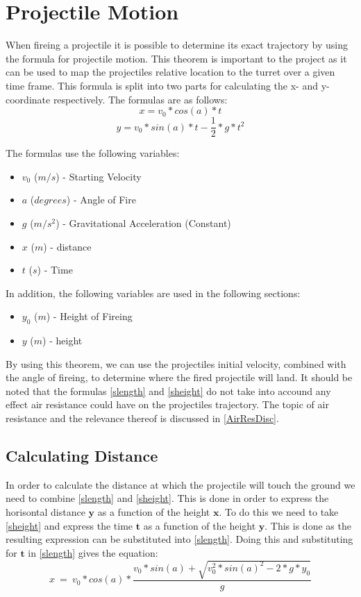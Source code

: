 \section{Projectile Motion}\label{ProjMotion}
When fireing a projectile it is possible to determine its exact trajectory by
using the formula for projectile motion. This theorem is important to the
project as it can be used to map the projectiles relative location to the turret
over a given time frame. This formula is split into two parts for calculating
the x- and y-coordinate respectively. The formulas are as follows:
\begin{equation}\label{slength}
x=v_0*cos(a)*t
\end{equation}
\begin{equation}\label{sheight}
y=v_0*sin(a)*t-\frac{1}{2}*g*t^2
\end{equation}

The formulas use the following variables:
\begin{itemize}
  \item $v_0$ ($m/s$) - Starting Velocity 
  \item $a$ ($degrees$) - Angle of Fire 
  \item $g$ ($m/s^2$) - Gravitational Acceleration (Constant)
  \item $x$ ($m$) - distance
  \item $t$ ($s$) - Time
\end{itemize}
In addition, the following variables are used in the following sections:
\begin{itemize}
  \item $y_0$ ($m$) - Height of Fireing 
  \item $y$ ($m$) - height
\end{itemize}

By using this theorem, we can use the projectiles initial velocity, combined
with the angle of fireing, to determine where the fired projectile will
land.\nl
It should be noted that the formulas \autoref{slength} and \autoref{sheight} do
not take into accound any effect air resistance could have on the projectiles
trajectory. The topic of air resistance and the relevance thereof is discussed
in \autoref{AirResDisc}.

\subsection{Calculating Distance}\label{CalcDist}
In order to calculate the distance at which the projectile will touch the ground
we need to combine \autoref{slength} and \autoref{sheight}. This is done in
order to express the horisontal distance $\mathbf{y}$ as a function of the
height $\mathbf{x}$. To do this we need to take \autoref{sheight} and express
the time $\mathbf{t}$ as a function of the height $\mathbf{y}$. This is done as the
resulting expression can be substituted into \autoref{slength}. Doing this
and substituting for $\mathbf{t}$ in \autoref{slength} gives the equation:
\begin{equation}\label{FinEq}
x\ =\ v_0*cos(a)*\frac{v_0*sin(a)+\sqrt{v_0^2*sin(a)^2-2*g*y_0}}{g}
\end{equation}

